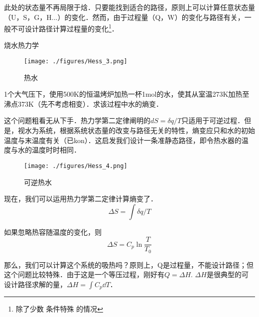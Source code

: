 此处的状态量不再局限于焓．只要能找到适合的路径，原则上可以计算任意状态量（U，S，G，H...）的变化．然而，由于过程量（Q，W）的变化与路径有关，一般不可设计路径计算过程量的变化\footnote{除了少数 条件特殊 的情况}．

\begin{example}{烧水热力学}
\begin{figure}[ht]
\centering
\texttt{[image: ./figures/Hess\_3.png]}
\caption{热水} \label{Hess_fig3}
\end{figure}
1个大气压下，使用500K的恒温烤炉加热一杯1mol的水，使其从室温273K加热至沸点373K（先不考虑相变）．求该过程中水的熵变．

这个问题粗看无从下手．热力学第二定律阐明的$dS=\delta q/T$只适用于可逆过程．但是，视水为系统，根据系统状态量的改变与路径无关的特性，熵变应只和水的初始温度与末温度有关（已kon）．这启发我们设计一条准静态路径，即令热水器的温度与水的温度时时相同．

\begin{figure}[ht]
\centering
\texttt{[image: ./figures/Hess\_4.png]}
\caption{可逆热水} \label{Hess_fig4}
\end{figure}
现在，我们可以运用热力学第二定律计算熵变了．
$$\Delta S=\int \delta q/T$$

如果忽略热容随温度的变化，则 
$$\Delta S=C_p \ln \frac{T}{T_0}$$

那么，我们可以计算这个系统的吸热吗？原则上，Q是过程量，不能设计路径；但这个问题比较特殊．由于这是一个等压过程，刚好有$Q=\Delta H$. $\Delta H$是很典型的可设计路径求解的量，$\Delta H = \int C_p \dd T$．
\end{example}
